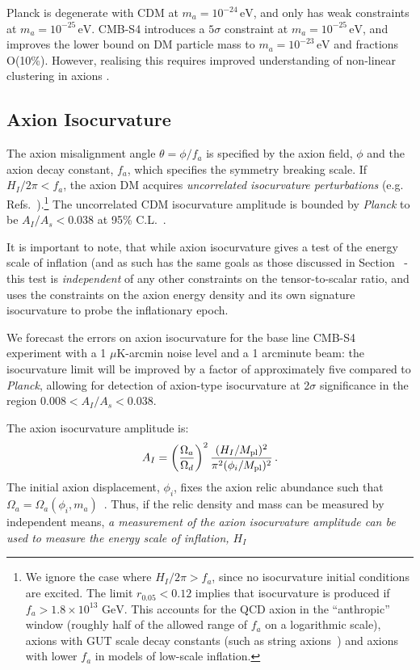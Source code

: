 Planck is degenerate with CDM at $m_a=10^{-24}\,\mathrm{eV}$, and only has weak constraints at $m_a=10^{-25}\,\mathrm{eV}$. CMB-S4 introduces a $5\sigma$ constraint at $m_a=10^{-25}\,\mathrm{eV}$, and improves the lower bound on DM particle mass to $m_a=10^{-23}\,\mathrm{eV}$ and fractions O(10\%). However, realising this requires improved understanding of non-linear clustering in axions \cite{Marsh:2016vgj}.

\subsection{Axion Isocurvature \label{axion_iso}}
The axion misalignment angle $\theta = \phi/f_a$ is specified by the axion field, $\phi$ and the axion decay constant, $f_a$, which specifies the symmetry breaking scale. If $H_I/2\pi<f_a$, the axion DM acquires \emph{uncorrelated isocurvature perturbations} (e.g. Refs.~\cite{Axenides:1983hj,Fox:2004kb,Hertzberg:2008wr}).\footnote{We ignore the case where $H_I/2\pi>f_a$, since no isocurvature initial conditions are excited. The limit $r_{0.05}<0.12$ implies that isocurvature is produced if $f_a>1.8\times 10^{13}\text{ GeV}$. This accounts for the QCD axion in the ``anthropic'' window (roughly half of the allowed range of $f_a$ on a logarithmic scale), axions with GUT scale decay constants (such as string axions~\cite{Svrcek:2006yi,Arvanitaki:2009fg}) and axions with lower $f_a$ in models of low-scale inflation.} The uncorrelated CDM isocurvature amplitude is bounded by \emph{Planck} to be $A_I/A_s<0.038$ at 95\% C.L.~\cite{Ade:2015lrj}. 

It is important to note, that while axion isocurvature gives a test of the energy scale of inflation (and as such has the same goals as those discussed in Section~\label{sec:scale-of-inflation} - this test is \textit{independent} of any other constraints on the tensor-to-scalar ratio, and uses the constraints on the axion energy density and its own signature isocurvature to probe the inflationary epoch.

We forecast the errors on axion isocurvature for the base line CMB-S4 experiment with a 1 $\mu$K-arcmin noise level and a 1 arcminute beam: the isocurvature limit will be improved by a factor of approximately five compared to \emph{Planck}, allowing for detection of axion-type isocurvature at 2$\sigma$ significance in the region $0.008<A_I/A_s<0.038$.

The axion isocurvature amplitude is:
\begin{equation}
A_I = \left(\frac{\Omega_a}{\Omega_d}\right)^2\frac{(H_I/M_{\rm pl})^2}{\pi^2(\phi_i/M_{\rm pl})^2} \, .
\label{eqn:iso_amplitude}
\end{equation}
The initial axion displacement, $\phi_i$, fixes the axion relic abundance such that $\Omega_a=\Omega_a (\phi_i,m_a)$~\cite{Preskill:1982cy,Abbott:1982af,Dine:1982ah,Turner:1983he,Steinhardt:1983ia,Marsh:2010wq}. Thus, if the relic density and mass can be measured by independent means, \emph{a measurement of the axion isocurvature amplitude can be used to measure the energy scale of inflation, $H_I$}

